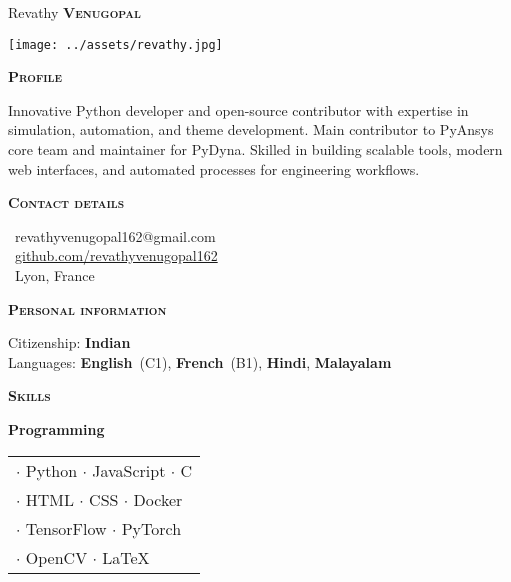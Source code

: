 \documentclass[11pt, a4paper]{article}
\newcommand{\headleft}[1]{\vspace*{3ex}\textsc{\textbf{#1}}\par%
    \vspace*{-1.5ex}\hrulefill\par\vspace*{0.7ex}}
\begin{document}
\setlength{\topskip}{0pt}
\setlength{\parindent}{0pt}
\setlength{\parskip}{0pt}
\setlength{\fboxsep}{0pt}
\pagestyle{empty}
\raggedbottom

\begin{minipage}[t]{0.33\textwidth} %
\colorbox{cvblue}{\begin{minipage}[t][5mm][t]{\textwidth}\null\hfill\null\end{minipage}}

\vspace{-.2ex} %
\colorbox{cvblue!90}{\color{white}  %
\textwidth\relax%
\begin{minipage}[t][293mm][t]{0.82\textwidth}
\raggedright
\vspace*{2.5ex}

\Large Revathy \textbf{\textsc{Venugopal}} \normalsize 

\null\hfill\texttt{[image: ../assets/revathy.jpg]}\hfill\null

\vspace*{0.5ex} %

\headleft{Profile}
Innovative Python developer and open-source contributor with expertise in simulation, automation, and theme development. Main contributor to PyAnsys core team and maintainer for PyDyna. Skilled in building scalable tools, modern web interfaces, and automated processes for engineering workflows.

\headleft{Contact details}
\small %
\MVAt\ {\small revathyvenugopal162@gmail.com} \\[0.4ex]
\Mundus\ \href{https://github.com/Revathyvenugopal162}{github.com/revathyvenugopal162} \\[0.1ex]
\Letter\ Lyon, France
\normalsize

\headleft{Personal information}
Citizenship: \textbf{Indian} \\[0.5ex]
Languages: \textbf{English}~(C1), \textbf{French}~(B1), \textbf{Hindi}, \textbf{Malayalam}
\normalsize

\headleft{Skills}
\small

\vspace{0.5ex}
\textbf{Programming}\\
\vspace{0.5ex}
\begin{tabularx}{\linewidth}{X}
$\cdot$ Python $\cdot$ JavaScript $\cdot$ C \\ $\cdot$ HTML $\cdot$ CSS $\cdot$ Docker \\ $\cdot$ TensorFlow $\cdot$ PyTorch \\ $\cdot$ OpenCV $\cdot$ LaTeX
\end{tabularx}


\end{minipage}}
\end{minipage}
\end{document}
